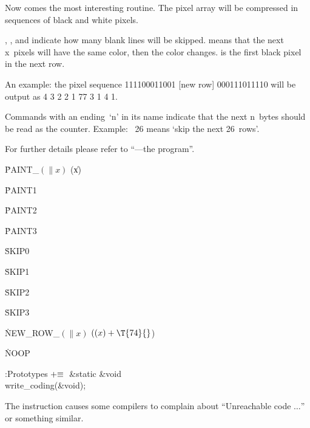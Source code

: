 Now comes the most interesting routine. The pixel array will be compressed
in sequences of black and white pixels.

, , and  indicate how many blank
lines will be skipped.
 means that the next x~pixels will have the same color,
then the
color changes.  is the first black pixel in the next
row.

An example: the pixel sequence 111100011001 [new row] 000111011110 will be
output as 4 3 2 2 1 77 3 1 4 1.

Commands with an ending~`n' in its name indicate that the next n~bytes
should be read as the counter. Example: ~26 means `skip the next
26~rows'.

For further details please refer to ``\mf---the program''.

\Y\B\4\D\.{PAINT\_}$(\|x)$\5
(\|x)\par
\B\4\D\.{PAINT1}\5
\par
\B\4\D\.{PAINT2}\5
\par
\B\4\D\.{PAINT3}\5
\Y\par
\B\4\D\.{SKIP0}\5
\par
\B\4\D\.{SKIP1}\5
\par
\B\4\D\.{SKIP2}\5
\par
\B\4\D\.{SKIP3}\5
\Y\par
\B\4\D\.{NEW\_ROW\_}$(\|x)$\5
$((\|x)+\T{74}{}$)\Y\par
\B\4\D\.{NOOP}\5
\par
\Y\B\4:Prototypes\X${}\mathrel+\equiv{}$\6
\&{static} \&{void} \\{write\_coding}(\&{void});\par
\fi

The  instruction causes some compilers to complain about
``Unreachable code $\ldots$'' or something similar.

